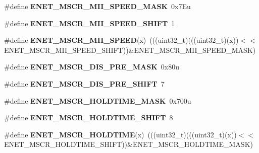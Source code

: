\begin{DoxyCompactItemize}
\item 
\#define {\bfseries E\+N\+E\+T\+\_\+\+M\+S\+C\+R\+\_\+\+M\+I\+I\+\_\+\+S\+P\+E\+E\+D\+\_\+\+M\+A\+SK}~0x7\+Eu\hypertarget{group__ENET__Register__Masks_ga1cb1a68c64288642ffaba2a5866990cc}{}\label{group__ENET__Register__Masks_ga1cb1a68c64288642ffaba2a5866990cc}

\item 
\#define {\bfseries E\+N\+E\+T\+\_\+\+M\+S\+C\+R\+\_\+\+M\+I\+I\+\_\+\+S\+P\+E\+E\+D\+\_\+\+S\+H\+I\+FT}~1\hypertarget{group__ENET__Register__Masks_ga82d16561cec7a3078e68de4d7c9c72f2}{}\label{group__ENET__Register__Masks_ga82d16561cec7a3078e68de4d7c9c72f2}

\item 
\#define {\bfseries E\+N\+E\+T\+\_\+\+M\+S\+C\+R\+\_\+\+M\+I\+I\+\_\+\+S\+P\+E\+ED}(x)~(((uint32\+\_\+t)(((uint32\+\_\+t)(x))$<$$<$E\+N\+E\+T\+\_\+\+M\+S\+C\+R\+\_\+\+M\+I\+I\+\_\+\+S\+P\+E\+E\+D\+\_\+\+S\+H\+I\+FT))\&E\+N\+E\+T\+\_\+\+M\+S\+C\+R\+\_\+\+M\+I\+I\+\_\+\+S\+P\+E\+E\+D\+\_\+\+M\+A\+SK)\hypertarget{group__ENET__Register__Masks_ga99659f5579cf09698781ff2928e82e2e}{}\label{group__ENET__Register__Masks_ga99659f5579cf09698781ff2928e82e2e}

\item 
\#define {\bfseries E\+N\+E\+T\+\_\+\+M\+S\+C\+R\+\_\+\+D\+I\+S\+\_\+\+P\+R\+E\+\_\+\+M\+A\+SK}~0x80u\hypertarget{group__ENET__Register__Masks_ga9387f22e8849499571e0755718ff4d73}{}\label{group__ENET__Register__Masks_ga9387f22e8849499571e0755718ff4d73}

\item 
\#define {\bfseries E\+N\+E\+T\+\_\+\+M\+S\+C\+R\+\_\+\+D\+I\+S\+\_\+\+P\+R\+E\+\_\+\+S\+H\+I\+FT}~7\hypertarget{group__ENET__Register__Masks_gaa4bd1e56f919591ae627d376271da560}{}\label{group__ENET__Register__Masks_gaa4bd1e56f919591ae627d376271da560}

\item 
\#define {\bfseries E\+N\+E\+T\+\_\+\+M\+S\+C\+R\+\_\+\+H\+O\+L\+D\+T\+I\+M\+E\+\_\+\+M\+A\+SK}~0x700u\hypertarget{group__ENET__Register__Masks_gaf0be3bf4ebe6e922406c96f80faf3481}{}\label{group__ENET__Register__Masks_gaf0be3bf4ebe6e922406c96f80faf3481}

\item 
\#define {\bfseries E\+N\+E\+T\+\_\+\+M\+S\+C\+R\+\_\+\+H\+O\+L\+D\+T\+I\+M\+E\+\_\+\+S\+H\+I\+FT}~8\hypertarget{group__ENET__Register__Masks_ga78800fa8f2240e5d4c1ce06aa39a822e}{}\label{group__ENET__Register__Masks_ga78800fa8f2240e5d4c1ce06aa39a822e}

\item 
\#define {\bfseries E\+N\+E\+T\+\_\+\+M\+S\+C\+R\+\_\+\+H\+O\+L\+D\+T\+I\+ME}(x)~(((uint32\+\_\+t)(((uint32\+\_\+t)(x))$<$$<$E\+N\+E\+T\+\_\+\+M\+S\+C\+R\+\_\+\+H\+O\+L\+D\+T\+I\+M\+E\+\_\+\+S\+H\+I\+FT))\&E\+N\+E\+T\+\_\+\+M\+S\+C\+R\+\_\+\+H\+O\+L\+D\+T\+I\+M\+E\+\_\+\+M\+A\+SK)\hypertarget{group__ENET__Register__Masks_ga334350e40871b467d4f021a32485cdc2}{}\label{group__ENET__Register__Masks_ga334350e40871b467d4f021a32485cdc2}


\end{DoxyCompactItemize}
